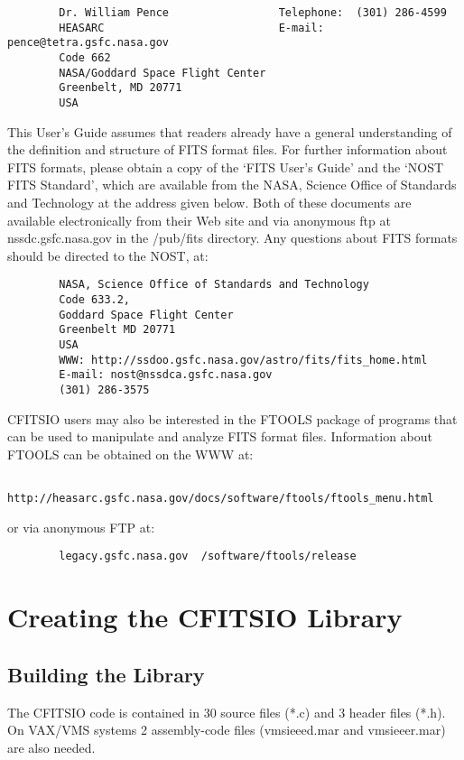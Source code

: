\begin{verbatim}
        Dr. William Pence                 Telephone:  (301) 286-4599
        HEASARC                           E-mail: pence@tetra.gsfc.nasa.gov
        Code 662
        NASA/Goddard Space Flight Center
        Greenbelt, MD 20771
        USA
\end{verbatim}
This User's Guide assumes that readers already have a general
understanding of the definition and structure of FITS format files.
For further information about FITS formats, please obtain a copy of the
`FITS User's Guide' and the `NOST FITS Standard', which are available
from the NASA, Science Office of Standards and Technology at the
address given below.  Both of these documents are available
electronically from their Web site and via anonymous ftp at
nssdc.gsfc.nasa.gov in the /pub/fits directory. Any questions about
FITS formats should be directed to the NOST, at:

\begin{verbatim}
        NASA, Science Office of Standards and Technology
        Code 633.2,
        Goddard Space Flight Center
        Greenbelt MD 20771
        USA
        WWW: http://ssdoo.gsfc.nasa.gov/astro/fits/fits_home.html
        E-mail: nost@nssdca.gsfc.nasa.gov
        (301) 286-3575
\end{verbatim}
CFITSIO users may also be interested in the FTOOLS package of programs
that can be used to manipulate and analyze FITS format files.
Information about FTOOLS can be obtained on the WWW at:

\begin{verbatim}
        http://heasarc.gsfc.nasa.gov/docs/software/ftools/ftools_menu.html
\end{verbatim}
or via anonymous FTP at:

\begin{verbatim}
        legacy.gsfc.nasa.gov  /software/ftools/release
\end{verbatim}

\chapter{ Creating the CFITSIO Library }


\section{Building the Library}

The CFITSIO code is contained in 30 source files (*.c) and 3 header
files (*.h). On VAX/VMS systems 2 assembly-code files (vmsieeed.mar and
vmsieeer.mar) are also needed.

